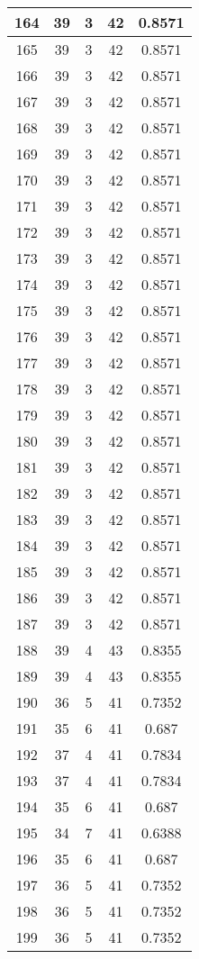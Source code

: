 \documentclass[letterpaper, 12pt]{article}
\begin{document}
\begin{longtable}{|c|c|c|c|c|}
\hline
164 & 39 & 3 & 42 & 0.8571 \\
\hline
165 & 39 & 3 & 42 & 0.8571 \\
\hline
166 & 39 & 3 & 42 & 0.8571 \\
\hline
167 & 39 & 3 & 42 & 0.8571 \\
\hline
168 & 39 & 3 & 42 & 0.8571 \\
\hline
169 & 39 & 3 & 42 & 0.8571 \\
\hline
170 & 39 & 3 & 42 & 0.8571 \\
\hline
171 & 39 & 3 & 42 & 0.8571 \\
\hline
172 & 39 & 3 & 42 & 0.8571 \\
\hline
173 & 39 & 3 & 42 & 0.8571 \\
\hline
174 & 39 & 3 & 42 & 0.8571 \\
\hline
175 & 39 & 3 & 42 & 0.8571 \\
\hline
176 & 39 & 3 & 42 & 0.8571 \\
\hline
177 & 39 & 3 & 42 & 0.8571 \\
\hline
178 & 39 & 3 & 42 & 0.8571 \\
\hline
179 & 39 & 3 & 42 & 0.8571 \\
\hline
180 & 39 & 3 & 42 & 0.8571 \\
\hline
181 & 39 & 3 & 42 & 0.8571 \\
\hline
182 & 39 & 3 & 42 & 0.8571 \\
\hline
183 & 39 & 3 & 42 & 0.8571 \\
\hline
184 & 39 & 3 & 42 & 0.8571 \\
\hline
185 & 39 & 3 & 42 & 0.8571 \\
\hline
186 & 39 & 3 & 42 & 0.8571 \\
\hline
187 & 39 & 3 & 42 & 0.8571 \\
\hline
188 & 39 & 4 & 43 & 0.8355 \\
\hline
189 & 39 & 4 & 43 & 0.8355 \\
\hline
190 & 36 & 5 & 41 & 0.7352 \\
\hline
191 & 35 & 6 & 41 & 0.687 \\
\hline
192 & 37 & 4 & 41 & 0.7834 \\
\hline
193 & 37 & 4 & 41 & 0.7834 \\
\hline
194 & 35 & 6 & 41 & 0.687 \\
\hline
195 & 34 & 7 & 41 & 0.6388 \\
\hline
196 & 35 & 6 & 41 & 0.687 \\
\hline
197 & 36 & 5 & 41 & 0.7352 \\
\hline
198 & 36 & 5 & 41 & 0.7352 \\
\hline
199 & 36 & 5 & 41 & 0.7352 \\
\hline
\end{longtable}
\end{document}
